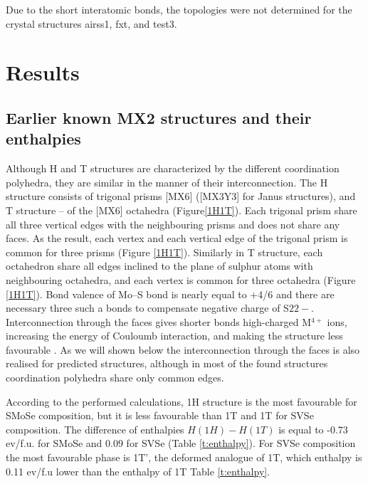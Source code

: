 \documentclass[a4paperm]{article}
\begin{document}
Due to the short interatomic bonds, the topologies were not determined for the crystal structures airss1, fxt, and  test3.


			\section{Results}

\subsection*{Earlier known MX2 structures and their enthalpies}

Although H and T structures are characterized by the different coordination polyhedra, they are similar in the manner of their interconnection.
The H structure consists of trigonal prisms [MX6] ([MX3Y3] for Janus structures), and T structure – of the [MX6] octahedra (Figure\ref{1H1T}).
Each trigonal prism share all three vertical edges with the neighbouring prisms and does not share any faces.
As the result, each vertex and each vertical edge of the trigonal prism is common for three prisms (Figure \ref{1H1T}).
Similarly in T structure, each octahedron share all edges inclined to the plane of sulphur atoms with neighbouring octahedra, and each vertex is common for three octahedra (Figure \ref{1H1T}).
Bond valence of Mo--S bond is nearly equal to +4/6 and there are necessary three such a bonds to compensate negative charge of S$2{2-}$.
Interconnection through the faces gives shorter bonds high-charged M$^{4+}$ ions, increasing the energy of Couloumb interaction, and making the structure less favourable \cite{pauling1929}.
As we will shown below the interconnection through the faces is also realised for predicted structures, although in most of the found structures coordination polyhedra share only common edges.

According to the performed calculations, 1H structure is the most favourable for SMoSe composition, but it is less favourable than 1T and 1T for SVSe composition.
The difference of enthalpies $H(1H)-H(1T)$ is equal to -0.73 ev/f.u. for SMoSe and 0.09 for SVSe (Table \ref{t:enthalpy}).
For SVSe composition the most favourable phase is 1T', the deformed analogue of 1T, which enthalpy is 0.11 ev/f.u lower than the enthalpy of 1T Table \ref{t:enthalpy}. 
\end{document}
